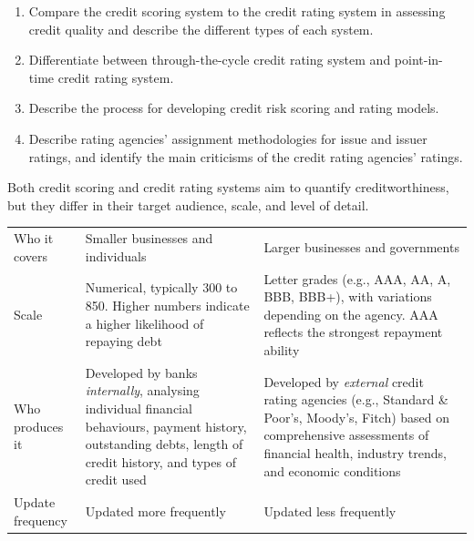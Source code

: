 
\begin{crkeybox}
\begin{enumerate}[label=\textbf{\alph*.},leftmargin=2em]
\item Compare the credit scoring system to the credit rating system in assessing credit quality and describe the different types of each system.
\item Differentiate between through-the-cycle credit rating system and point-in-time credit rating system.
\item Describe the process for developing credit risk scoring and rating models.
\item Describe rating agencies' assignment methodologies for issue and issuer ratings, and identify the main criticisms of the credit rating agencies' ratings.
\end{enumerate}
\end{crkeybox}


Both credit scoring and credit rating systems aim to quantify creditworthiness,
but they differ in their target audience, scale, and level of detail.

\begin{center}
\footnotesize
\begin{tabular}{L{2.6cm} L{5.8cm} L{6.2cm}}
\toprule
 &  &  \\
\midrule
Who it covers & Smaller businesses and individuals &
  Larger businesses and governments \\
Scale & Numerical, typically 300 to 850. Higher numbers indicate a higher
  likelihood of repaying debt &
  Letter grades (e.g., AAA, AA, A, BBB, BBB+), with variations depending on the
  agency. AAA reflects the strongest repayment ability \\
Who produces it & Developed by banks \emph{internally}, analysing individual
  financial behaviours, payment history, outstanding debts, length of credit
  history, and types of credit used &
  Developed by \emph{external} credit rating agencies (e.g., Standard \& Poor's,
  Moody's, Fitch) based on comprehensive assessments of financial health,
  industry trends, and economic conditions \\
Update frequency & Updated more frequently & Updated less frequently \\
\bottomrule
\end{tabular}
\end{center}

